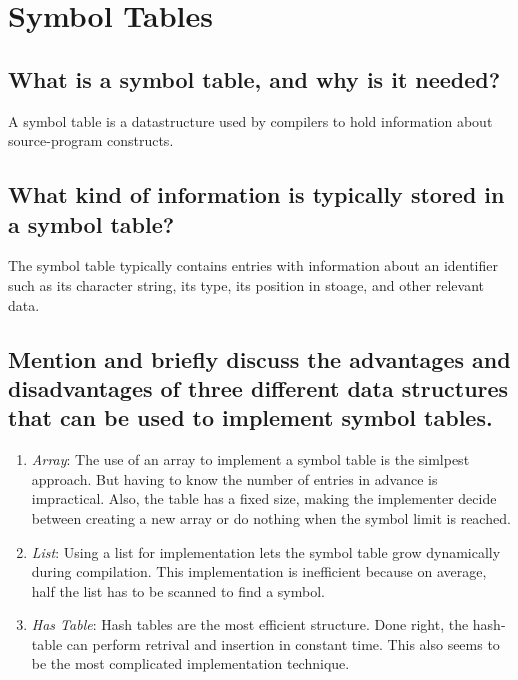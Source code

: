 \section{Symbol Tables}
\subsection{What is a symbol table, and why is it needed?}
A symbol table is a datastructure used by compilers to hold information about source-program constructs. 
\subsection{What kind of information is typically stored in a symbol table?}
The symbol table typically contains entries with information about an identifier such as its character string, its type, its position in stoage, and other relevant data. 
\subsection{Mention and briefly discuss the advantages and disadvantages of three different data structures that can be used to implement symbol tables.}
\begin{enumerate}
	\item{\emph{Array}: The use of an array to implement a symbol table is the simlpest approach. But having to know the number of entries in advance is impractical. Also, the table has a fixed size, making the implementer decide between creating a new array or do nothing when the symbol limit is reached. }
	\item{\emph{List}: Using a list for implementation lets the symbol table grow dynamically during compilation. This implementation is inefficient because on average, half the list has to be scanned to find a symbol.}
	\item{\emph{Has Table}: Hash tables are the most efficient structure. Done right, the hash-table can perform retrival and insertion in constant time. This also seems to be the most complicated implementation technique.}	

\end{enumerate}
